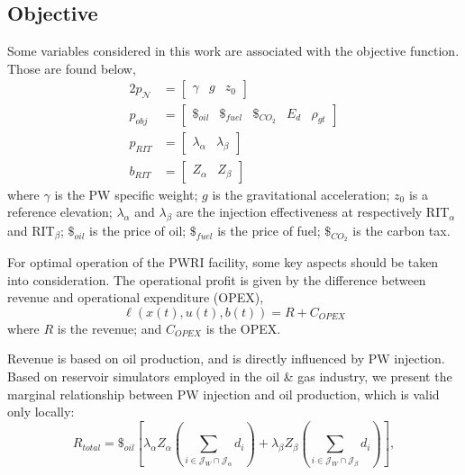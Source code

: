 \subsection{Objective}
    \par Some variables considered in this work are associated with the objective function. Those are found below,
    \begin{alignat}{2}
        p_{\mathcal{N}} &= \left[\begin{array}{ccccc}
            \gamma & g & z_0
        \end{array} \right]
        \\
        p_{obj} &= \left[\begin{array}{ccccc}\$_{oil} & \$_{fuel} & \$_{CO_2} & E_d & \rho_{gt} \end{array}\right]
        \\
        p_{RIT} &= \left[\begin{array}{cc} \lambda_\alpha & \lambda_\beta \end{array}\right]
        \\
        b_{RIT} &= \left[\begin{array}{cc} Z_\alpha & Z_\beta \end{array}\right]
    \end{alignat}
    where $\gamma$ is the PW specific weight; $g$ is the gravitational acceleration; $z_0$ is a reference elevation; $\lambda_\alpha$ and $\lambda_\beta$ are the injection effectiveness at respectively RIT$_\alpha$ and RIT$_\beta$; $\$_{oil}$ is the price of oil; $\$_{fuel}$ is the price of fuel; $\$_{CO_2}$ is the carbon tax.
    \par For optimal operation of the PWRI facility, some key aspects should be taken into consideration.  The operational profit is given by the difference between revenue and operational expenditure (OPEX),
    \begin{equation}
        \ell(x(t),u(t),b(t)) = R + C_{OPEX}
    \end{equation}
    where $R$ is the revenue; and $C_{OPEX}$ is the OPEX.
    \par Revenue is based on oil production, and is directly influenced by PW injection. Based on reservoir simulators employed in the oil \& gas industry, we present the marginal relationship between PW injection and oil production, which is valid only locally:
    \begin{equation}
        R_{total} = \$_{oil}\left[\lambda_\alpha Z_\alpha \left(\sum_{i\in\mathcal{J}_W \cap \mathcal{J}_\alpha} d_{i}\right) + \lambda_\beta Z_\beta\left(\sum_{i\in\mathcal{J}_W \cap \mathcal{J}_\beta} d_{i} \right)\right], \label{obj:revenue_total}
    \end{equation}
